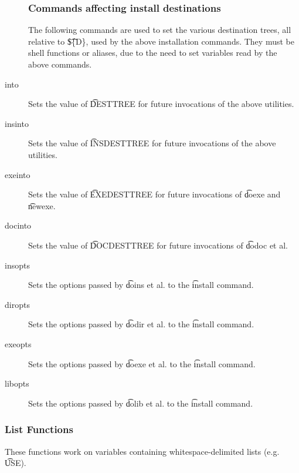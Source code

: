 \begin{description}
\subsubsection{Commands affecting install destinations}
The following commands are used to set the various destination trees, all relative to \t{\$\{D\}},
used by the above installation commands. They must be shell functions or aliases, due to the need to
set variables read by the above commands.

\item[into] Sets the value of \t{DESTTREE} for future invocations of the above utilities.

\item[insinto] Sets the value of \t{INSDESTTREE} for future invocations of the above utilities.

\item[exeinto] Sets the value of \t{EXEDESTTREE} for future invocations of \t{doexe} and \t{newexe}.

\item[docinto] Sets the value of \t{DOCDESTTREE} for future invocations of \t{dodoc} et al.

\item[insopts] Sets the options passed by \t{doins} et al. to the \t{install} command.

\item[diropts] Sets the options passed by \t{dodir} et al. to the \t{install} command.

\item[exeopts] Sets the options passed by \t{doexe} et al. to the \t{install} command.

\item[libopts] Sets the options passed by \t{dolib} et al. to the \t{install} command.

\end{description}

\subsubsection{List Functions}
These functions work on variables containing whitespace-delimited lists (e.g. \t{USE}).

